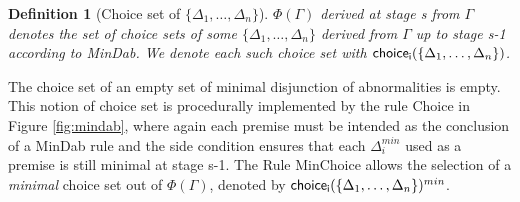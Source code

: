\documentclass[]{article}
\newtheorem{definition}{Definition}
\begin{document}
\begin{definition}[Choice set of $\{\Delta_{1}, \dots, \Delta_{n}\}$]
$\Phi(\Gamma)$ derived at stage {\sf s} from $\Gamma$ denotes the set of choice sets of some $\{\Delta_{1}, \dots, \Delta_{n}\}$ derived from $\Gamma$ up to stage {\sf s-1} according to {\sf MinDab}. We denote each such choice set with ${\sf choice_{i}}(\{\Delta_{1}, \dots, \Delta_{n}\})$.
\end{definition}

The choice set of an empty set of minimal disjunction of abnormalities is empty. This notion of choice set is procedurally implemented by the rule {\sf Choice} in Figure \ref{fig:mindab}, where again each premise must be intended as the conclusion of a {\sf MinDab} rule and the side condition ensures that each $\Delta_{i}^{min}$ used as a premise is still minimal at stage {\sf s-1}. The Rule {\sf MinChoice} allows the selection of a \textit{minimal} choice set out of $\Phi(\Gamma)$, denoted by ${\sf choice_{i}}(\{\Delta_{1},\ldots, \Delta_{n}\})^{min}$.
\end{document}

